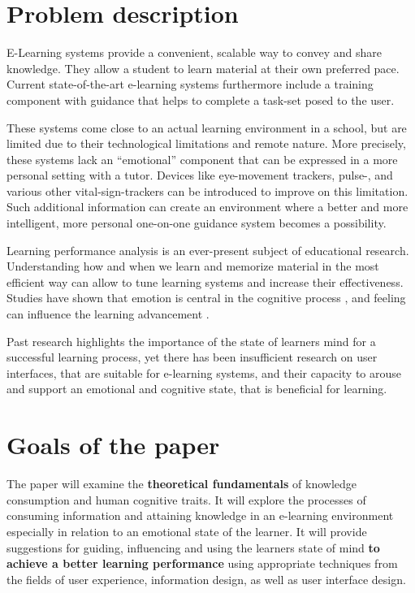 \section {Problem description}

E-Learning systems provide a convenient, scalable way to convey and share knowledge. They allow a student to learn material at their own preferred pace. 
Current state-of-the-art e-learning systems furthermore include a training component with guidance that helps to complete a task-set posed to the user.

These systems come close to an actual learning environment in a school, but are limited due to their technological limitations and remote nature. More precisely, these systems lack an “emotional” component that can be expressed in a more personal setting with a tutor. Devices like eye-movement trackers, pulse-, and various other vital-sign-trackers can be introduced to improve on this limitation. Such additional information can create an environment where a better and more intelligent, more personal one-on-one guidance system becomes a possibility.

Learning performance analysis is an ever-present subject of educational research. Understanding how and when we learn and memorize material in the most efficient way can allow to tune learning systems and increase their effectiveness. Studies have shown that emotion is central in the cognitive process \cite{ORegan2003}, and feeling can influence the learning advancement \cite{Hawkins2017}.

Past research highlights the importance of the state of learners mind for a successful learning process, yet there has been insufficient research on user interfaces, that are suitable for e-learning systems, and their capacity to arouse and support an emotional and cognitive state, that is beneficial for learning.


\section{Goals of the paper}

The paper will examine the \textbf{theoretical fundamentals} of knowledge consumption and human cognitive traits. 
It will explore the processes of consuming information and attaining knowledge in an e-learning environment especially in relation to an emotional state of the learner.
It will provide suggestions for guiding, influencing and using the learners state of mind \textbf{to achieve a better learning performance} using appropriate techniques from the fields of user experience, information design, as well as user interface design.


